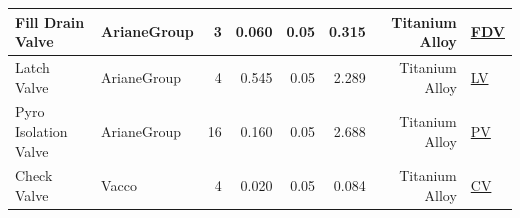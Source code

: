 \begin{table}[h]
{\begin{tabular}{|l|l|r|r|r|r|r|l|}
\hline
Fill Drain Valve                                               & ArianeGroup                                              & 3                                                        & 0.060                                                                                             & 0.05                                 & 0.315                                                                                          & Titanium Alloy           & \href{https://www.space-propulsion.com/brochures/valves/space-propulsion-valves.pdf}{FDV}                                                                                                                                          \\ 
\hline
Latch Valve                                                    & ArianeGroup                                              & 4                                                        & 0.545                                                                                             & 0.05                                 & 2.289                                                                                          & Titanium Alloy           & \href{https://www.space-propulsion.com/brochures/valves/space-propulsion-valves.pdf}{LV}                                                                                                                                               \\ 
\hline
Pyro Isolation Valve                                           & ArianeGroup                                              & 16                                                       & 0.160                                                                                             & 0.05                                 & 2.688                                                                                          & Titanium Alloy           & \href{https://www.space-propulsion.com/brochures/valves/space-propulsion-valves.pdf}{PV}                                                                                                                                                \\ 
\hline
Check Valve                                                    & {\cellcolor[rgb]{1,0.831,0.541}}Vacco                    & 4                                                        & 0.020                                                                                             & 0.05                                 & 0.084                                                                                          & Titanium Alloy           & \href{https://www.vacco.com/images/uploads/pdfs/check\_valves.pdf}{CV}                                                                                                                                                                 \\ 

\end{tabular}}
\end{table}
